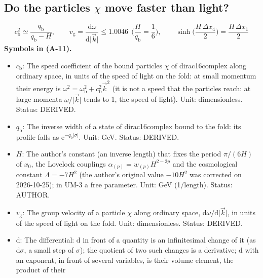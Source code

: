 \documentclass[
  10pt,
]{article}
\providecommand{\tightlist}{%
  \setlength{\itemsep}{0pt}\setlength{\parskip}{0pt}}
\begin{document}
\hypertarget{do-the-particles-chi-move-faster-than-light}{%
\subsection{\texorpdfstring{Do the particles \(\chi\) move faster than
light?}{Do the particles \textbackslash chi move faster than light?}}\label{do-the-particles-chi-move-faster-than-light}}

\[
c_{\mathrm{b}}^2 \simeq \frac{q_{\mathrm{b}}}{q_{\mathrm{b}} - H},\qquad
v_{\mathrm{g}} = \frac{\mathrm{d}\omega}{\mathrm{d}\lvert\vec k\rvert} \le 1.0046\ \ \Big(\frac{H}{q_{\mathrm{b}}} = \frac16\Big),\qquad
\sinh\Big(\frac{H\,\Delta x_4}{2}\Big) = \frac{H\,\Delta x_1}{2} \tag{A-11}
\] \textbf{Symbols in (A-11).}

\begin{itemize}
\tightlist
\item
  \(c_{\mathrm{b}}\): The speed coefficient of the bound particles
  \(\chi\) of dirac16complex along ordinary space, in units of the speed
  of light on the fold: at small momentum their energy is
  \(\omega^2 = \omega_{\mathrm{b}}^2 + c_{\mathrm{b}}^2\vec k^2\) (it is
  not a speed that the particles reach: at large momenta
  \(\omega/\lvert\vec k\rvert\) tends to 1, the speed of light). Unit:
  dimensionless. Status: DERIVED.
\item
  \(q_{\mathrm{b}}\): The inverse width of a state of dirac16complex
  bound to the fold: its profile falls as
  \(\mathrm{e}^{-q_{\mathrm{b}}\lvert\sigma\rvert}\). Unit: GeV. Status:
  DERIVED.
\item
  \(H\): The author's constant (an inverse length) that fixes the period
  \(\pi/(6H)\) of \(x_0\), the Lovelock couplings
  \(\alpha_{(p)} = w_{(p)}H^{2-2p}\) and the cosmological constant
  \(\Lambda = -7H^2\) (the author's original value \(-10H^2\) was
  corrected on 2026-10-25); in UM-3 a free parameter. Unit: GeV
  (1/length). Status: AUTHOR.
\item
  \(v_{\mathrm{g}}\): The group velocity of a particle \(\chi\) along
  ordinary space, \(\mathrm{d}\omega/\mathrm{d}\lvert\vec k\rvert\), in
  units of the speed of light on the fold. Unit: dimensionless. Status:
  DERIVED.
\item
  \(\mathrm{d}\): The differential: \(\mathrm{d}\) in front of a
  quantity is an infinitesimal change of it (as \(\mathrm{d}\sigma\), a
  small step of \(\sigma\)); the quotient of two such changes is a
  derivative; \(\mathrm{d}\) with an exponent, in front of several
  variables, is their volume element, the product of their

\end{itemize}
\end{document}
